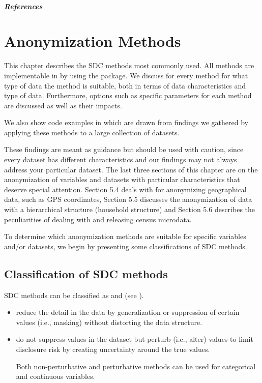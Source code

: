 \documentclass[letterpaper,10pt,english]{sphinxmanual}
\begin{document}
\paragraph{References}


\chapter{Anonymization Methods}
\label{\detokenize{anon_methods:anonymization-methods}}\label{\detokenize{anon_methods::doc}}
This chapter describes the SDC methods most commonly used. All methods
are implementable in  by using the  package. We discuss for
every method for what type of data the method is suitable, both in terms
of data characteristics and type of data. Furthermore, options such as
specific parameters for each method are discussed as well as their
impacts. %
\begin{footnote}[1]\sphinxAtStartFootnote
We also show code examples in  which are drawn from findings we
gathered by applying these methods to a large collection of datasets.
%
\end{footnote} These findings are meant as guidance but
should be used with caution, since every dataset has different
characteristics and our findings may not always address your particular
dataset. The last three sections of this chapter are on the
anonymization of variables and datasets with particular characteristics
that deserve special attention. Section 5.4 deals with for anonymizing
geographical data, such as GPS coordinates, Section 5.5 discusses the
anonymization of data with a hierarchical structure (household
structure) and Section 5.6 describes the peculiarities of dealing with
and releasing census microdata.

To determine which anonymization methods are suitable for specific
variables and/or datasets, we begin by presenting some classifications
of SDC methods.


\section{Classification of SDC methods}
\label{\detokenize{anon_methods:classification-of-sdc-methods}}
SDC methods can be classified as  and
 (see {\hyperref[\detokenize{anon_methods:hdfg12}]{}}).
\begin{itemize}
\item {} 
 reduce the detail in the data by
generalization or suppression of certain values (i.e., masking)
without distorting the data structure.

\item {} 
 do not suppress values in the dataset but
perturb (i.e., alter) values to limit disclosure risk by creating
uncertainty around the true values.

Both non-perturbative and perturbative methods can be used for
categorical and continuous variables.

\end{itemize}
\end{document}
